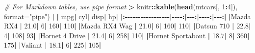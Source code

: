 \documentclass[
  a4paper,
  twoside,
  openright]{book}
\newenvironment{Shaded}{\begin{snugshade}}{\end{snugshade}}
\newcommand{\AttributeTok}[1]{\textcolor[rgb]{0.13,0.29,0.53}{#1}}
\newcommand{\CommentTok}[1]{\textcolor[rgb]{0.56,0.35,0.01}{\textit{#1}}}
\newcommand{\DecValTok}[1]{\textcolor[rgb]{0.00,0.00,0.81}{#1}}
\newcommand{\ErrorTok}[1]{\textcolor[rgb]{0.64,0.00,0.00}{\textbf{#1}}}
\newcommand{\FloatTok}[1]{\textcolor[rgb]{0.00,0.00,0.81}{#1}}
\newcommand{\FunctionTok}[1]{\textcolor[rgb]{0.13,0.29,0.53}{\textbf{#1}}}
\newcommand{\NormalTok}[1]{#1}
\newcommand{\SpecialCharTok}[1]{\textcolor[rgb]{0.81,0.36,0.00}{\textbf{#1}}}
\newcommand{\StringTok}[1]{\textcolor[rgb]{0.31,0.60,0.02}{#1}}
\theoremstyle{definition}
\theoremstyle{definition}
\theoremstyle{definition}
\theoremstyle{definition}
\theoremstyle{remark}
\begin{document}
\begin{Shaded}
\begin{Highlighting}[]
\CommentTok{\# For Markdown tables, use \textasciigrave{}pipe\textasciigrave{} format}
\SpecialCharTok{\textgreater{}}\NormalTok{ knitr}\SpecialCharTok{::}\FunctionTok{kable}\NormalTok{(}\FunctionTok{head}\NormalTok{(mtcars[, }\DecValTok{1}\SpecialCharTok{:}\DecValTok{4}\NormalTok{]), }\AttributeTok{format=}\StringTok{"pipe"}\NormalTok{)}
\SpecialCharTok{|}                  \ErrorTok{|}\NormalTok{  mpg}\SpecialCharTok{|}\NormalTok{ cyl}\SpecialCharTok{|}\NormalTok{ disp}\SpecialCharTok{|}\NormalTok{  hp}\SpecialCharTok{|}
\ErrorTok{|:}\SpecialCharTok{{-}{-}{-}{-}{-}{-}{-}{-}{-}{-}{-}{-}{-}{-}{-}{-}{-}}\ErrorTok{|}\SpecialCharTok{{-}{-}{-}{-}}\ErrorTok{:|}\SpecialCharTok{{-}{-}{-}}\ErrorTok{:|}\SpecialCharTok{{-}{-}{-}{-}}\ErrorTok{:|}\SpecialCharTok{{-}{-}{-}}\ErrorTok{:|}
\ErrorTok{|}\NormalTok{Mazda RX4         }\SpecialCharTok{|} \FloatTok{21.0}\SpecialCharTok{|}   \DecValTok{6}\SpecialCharTok{|}  \DecValTok{160}\SpecialCharTok{|} \DecValTok{110}\SpecialCharTok{|}
\ErrorTok{|}\NormalTok{Mazda RX4 Wag     }\SpecialCharTok{|} \FloatTok{21.0}\SpecialCharTok{|}   \DecValTok{6}\SpecialCharTok{|}  \DecValTok{160}\SpecialCharTok{|} \DecValTok{110}\SpecialCharTok{|}
\ErrorTok{|}\NormalTok{Datsun }\DecValTok{710}        \SpecialCharTok{|} \FloatTok{22.8}\SpecialCharTok{|}   \DecValTok{4}\SpecialCharTok{|}  \DecValTok{108}\SpecialCharTok{|}  \DecValTok{93}\SpecialCharTok{|}
\ErrorTok{|}\NormalTok{Hornet }\DecValTok{4}\NormalTok{ Drive    }\SpecialCharTok{|} \FloatTok{21.4}\SpecialCharTok{|}   \DecValTok{6}\SpecialCharTok{|}  \DecValTok{258}\SpecialCharTok{|} \DecValTok{110}\SpecialCharTok{|}
\ErrorTok{|}\NormalTok{Hornet Sportabout }\SpecialCharTok{|} \FloatTok{18.7}\SpecialCharTok{|}   \DecValTok{8}\SpecialCharTok{|}  \DecValTok{360}\SpecialCharTok{|} \DecValTok{175}\SpecialCharTok{|}
\ErrorTok{|}\NormalTok{Valiant           }\SpecialCharTok{|} \FloatTok{18.1}\SpecialCharTok{|}   \DecValTok{6}\SpecialCharTok{|}  \DecValTok{225}\SpecialCharTok{|} \DecValTok{105}\SpecialCharTok{|}


\end{Highlighting}
\end{Shaded}
\end{document}
